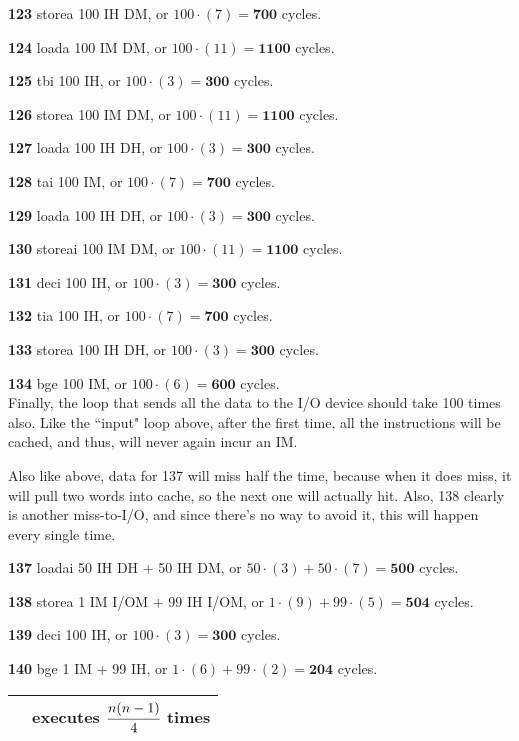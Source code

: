 \documentclass[a4paper]{article}
\begin{document}
\textbf{123} storea 100 IH DM, or $100 \cdot (7) = \mathbf{700}$ cycles.

\textbf{124} loada 100 IM DM, or $100 \cdot (11) = \mathbf{1100}$ cycles.

\textbf{125} tbi 100 IH, or $100 \cdot (3) = \mathbf{300}$ cycles.

\textbf{126} storea 100 IM DM, or $100 \cdot (11) = \mathbf{1100}$ cycles.

\textbf{127} loada 100 IH DH, or $100 \cdot (3) = \mathbf{300}$ cycles.

\textbf{128} tai 100 IM, or $100 \cdot (7) = \mathbf{700}$ cycles.

\textbf{129} loada 100 IH DH, or $100 \cdot (3) = \mathbf{300}$ cycles.

\textbf{130} storeai 100 IM DM, or $100 \cdot (11) = \mathbf{1100}$ cycles.

\textbf{131} deci 100 IH, or $100 \cdot (3) = \mathbf{300}$ cycles.

\textbf{132} tia 100 IH, or $100 \cdot (7) = \mathbf{700}$ cycles.

\textbf{133} storea 100 IH DH, or $100 \cdot (3) = \mathbf{300}$ cycles.

\textbf{134} bge 100 IM, or $100 \cdot (6) = \mathbf{600}$ cycles. \\

Finally, the loop that sends all the data to the I/O device should take 100 times also. Like the ``input" loop above, after the first time, all the instructions will be cached, and thus, will never again incur an IM.

Also like above, data for 137 will miss half the time, because when it does miss, it will pull two words into cache, so the next one will actually hit. Also, 138 clearly is another miss-to-I/O, and since there's no way to avoid it, this will happen every single time.

\textbf{137} loadai 50 IH DH + 50 IH DM, or $50 \cdot (3) + 50 \cdot (7) = \mathbf{500}$ cycles.

\textbf{138} storea 1 IM I/OM + 99 IH I/OM, or $1 \cdot (9) + 99 \cdot (5) = \mathbf{504}$ cycles.

\textbf{139} deci 100 IH, or $100 \cdot (3) = \mathbf{300}$ cycles.

\textbf{140} bge 1 IM + 99 IH, or $1 \cdot (6) + 99 \cdot (2) = \mathbf{204}$ cycles. \\

\begin{tabular}{|c|c|}
\hline
\cellcolor{green} & executes $\cfrac{n(n-1)}{4}$ times \\
\hline
\end{tabular}
\end{document}
